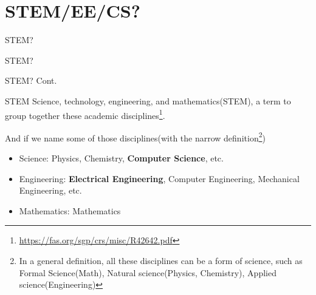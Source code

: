 \documentclass[aspectratio=169, 12pt]{beamer}
\begin{document}
\section{STEM/EE/CS?}
\begin{frame}{STEM?}
\end{frame}

\begin{frame}{STEM?}
\end{frame}

\begin{frame}{STEM? Cont.}
\begin{block}{STEM}
Science, technology, engineering, and mathematics(STEM), a term to group together these academic disciplines\footnote{\tiny\url{https://fas.org/sgp/crs/misc/R42642.pdf}}.
\end{block}

\begin{block}{ And if we name some of those disciplines(with the narrow definition\footnote{\tiny In a general definition, all these disciplines can be a form of science, such as Formal Science(Math), Natural science(Physics, Chemistry), Applied science(Engineering)})}
\begin{itemize}
\item Science: Physics, Chemistry, \textbf{Computer Science}, etc.
\item Engineering: \textbf{Electrical Engineering}, Computer Engineering, Mechanical Engineering, etc.
\item Mathematics: Mathematics
\end{itemize}
\end{block}
\end{frame}
\end{document}
